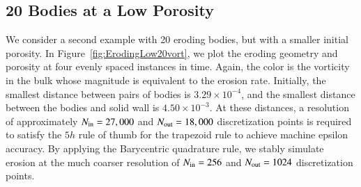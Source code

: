 \documentclass[preprint,10pt]{elsarticle}
\begin{document}
\subsection{20 Bodies at a Low Porosity}
We consider a second example with 20 eroding bodies, but with a smaller
initial porosity.  In Figure~\ref{fig:ErodingLow20vort}, we plot the
eroding geometry and porosity at four evenly spaced instances in time.
Again, the color is the vorticity in the bulk whose magnitude is
equivalent to the erosion rate.   Initially, the smallest distance
between pairs of bodies is $3.29 \times 10^{-4}$, and the smallest
distance between the bodies and solid wall is $4.50 \times 10^{-3}$.  At
these distances, a resolution of approximately $N_{\mathrm{in}} = 27,000$ and
$N_{\mathrm{out}} = 18,000$ discretization points is required to satisfy the $5h$
rule of thumb for the trapezoid rule to achieve machine epsilon
accuracy.  By applying the Barycentric quadrature rule, we stably
simulate erosion at the much coarser resolution of $N_{\mathrm{in}} = 256$ and
$N_{\mathrm{out}} = 1024$ discretization points.
\end{document}
